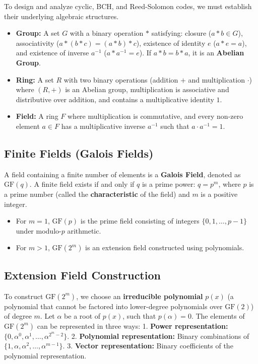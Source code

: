 \documentclass[12pt,a4paper]{article}
\begin{document}
To design and analyze cyclic, BCH, and Reed-Solomon codes, we must establish their underlying algebraic structures.

\begin{tcolorbox}[defbox, title={\textbf{Algebraic Structures Summary}}]
\begin{itemize}[leftmargin=*, itemsep=3pt, topsep=0pt]
  \item \textbf{Group:} A set $G$ with a binary operation $*$ satisfying: closure ($a * b \in G$), associativity ($a * (b * c) = (a * b) * c$), existence of identity $e$ ($a * e = a$), and existence of inverse $a^{-1}$ ($a * a^{-1} = e$). If $a * b = b * a$, it is an \textbf{Abelian Group}.
  \item \textbf{Ring:} A set $R$ with two binary operations (addition $+$ and multiplication $\cdot$) where $(R, +)$ is an Abelian group, multiplication is associative and distributive over addition, and contains a multiplicative identity $1$.
  \item \textbf{Field:} A ring $F$ where multiplication is commutative, and every non-zero element $a \in F$ has a multiplicative inverse $a^{-1}$ such that $a \cdot a^{-1} = 1$.
\end{itemize}
\end{tcolorbox}

\subsection{Finite Fields (Galois Fields)}
A field containing a finite number of elements is a \textbf{Galois Field}, denoted as $\text{GF}(q)$. A finite field exists if and only if $q$ is a prime power: $q = p^m$, where $p$ is a prime number (called the \textbf{characteristic} of the field) and $m$ is a positive integer.
\begin{itemize}[leftmargin=*, itemsep=2pt]
  \item For $m=1$, $\text{GF}(p)$ is the prime field consisting of integers $\{0, 1, \dots, p-1\}$ under modulo-$p$ arithmetic.
  \item For $m > 1$, $\text{GF}(2^m)$ is an extension field constructed using polynomials.
\end{itemize}

\subsection{Extension Field Construction}
To construct $\text{GF}(2^m)$, we choose an \textbf{irreducible polynomial} $p(x)$ (a polynomial that cannot be factored into lower-degree polynomials over $\text{GF}(2)$) of degree $m$. Let $\alpha$ be a root of $p(x)$, such that $p(\alpha) = 0$.
The elements of $\text{GF}(2^m)$ can be represented in three ways:
1. \textbf{Power representation:} $\{0, \alpha^0, \alpha^1, \dots, \alpha^{2^m-2}\}$.
2. \textbf{Polynomial representation:} Binary combinations of $\{1, \alpha, \alpha^2, \dots, \alpha^{m-1}\}$.
3. \textbf{Vector representation:} Binary coefficients of the polynomial representation.
\end{document}
